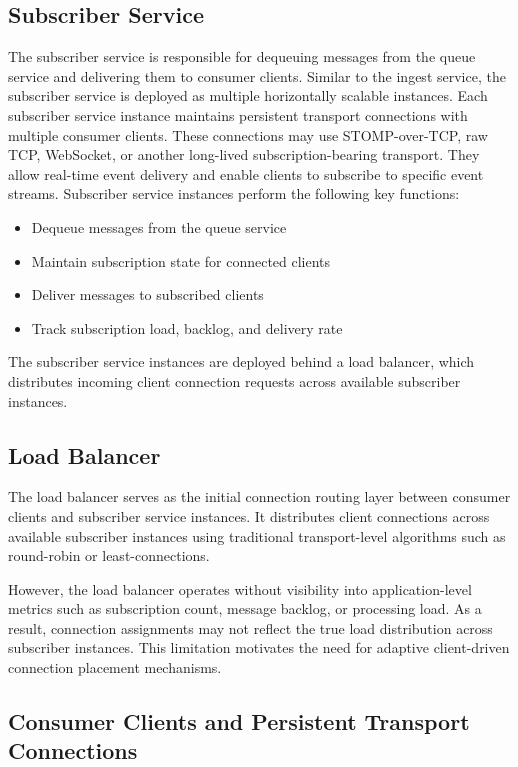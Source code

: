\documentclass[manuscript]{acmart}
\begin{document}
\subsection{Subscriber Service}

The subscriber service is responsible for dequeuing messages from the queue service and delivering them to consumer clients. Similar to the ingest service, the subscriber service is deployed as multiple horizontally scalable instances.
Each subscriber service instance maintains persistent transport connections with multiple consumer clients. These connections may use STOMP-over-TCP, raw TCP, WebSocket, or another long-lived subscription-bearing transport. They allow real-time event delivery and enable clients to subscribe to specific event streams.
Subscriber service instances perform the following key functions:

\begin{itemize}
	\item Dequeue messages from the queue service
	\item Maintain subscription state for connected clients
	\item Deliver messages to subscribed clients
	\item Track subscription load, backlog, and delivery rate
\end{itemize}

The subscriber service instances are deployed behind a load balancer, which distributes incoming client connection requests across available subscriber instances.

\subsection{Load Balancer}

The load balancer serves as the initial connection routing layer between consumer clients and subscriber service instances. It distributes client connections across available subscriber instances using traditional transport-level algorithms such as round-robin or least-connections.

However, the load balancer operates without visibility into application-level metrics such as subscription count, message backlog, or processing load. As a result, connection assignments may not reflect the true load distribution across subscriber instances.
This limitation motivates the need for adaptive client-driven connection placement mechanisms.

\subsection{Consumer Clients and Persistent Transport Connections}
\end{document}
